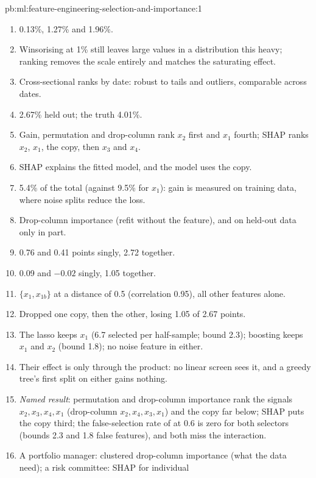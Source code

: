 \begin{solution}{pb:ml:feature-engineering-selection-and-importance:1}
\begin{enumerate}
\item 0.13\%, 1.27\% and 1.96\%.
\item Winsorising at 1\% still leaves large values in a distribution this heavy; ranking removes the scale entirely and
matches the saturating effect.
\item Cross-sectional ranks by date: robust to tails and outliers, comparable across dates.
\item 2.67\% held out; the truth 4.01\%.
\item Gain, permutation and drop-column rank $x_2$ first and $x_1$ fourth; SHAP ranks $x_2$, $x_1$, the copy, then $x_3$ and
$x_4$.
\item SHAP explains the fitted model, and the model uses the copy.
\item 5.4\% of the total (against 9.5\% for $x_1$): gain is measured on training data, where noise splits reduce the loss.
\item Drop-column importance (refit without the feature), and  on held-out data only in part.
\item 0.76 and 0.41 points singly, 2.72 together.
\item 0.09 and $-0.02$ singly, 1.05 together.
\item $\{x_1, x_{1b}\}$ at a distance of 0.5 (correlation 0.95), all other features alone.
\item Dropped one copy, then the other, losing 1.05 of 2.67 points.
\item The lasso keeps $x_1$ (6.7 selected per half-sample; bound 2.3); boosting keeps $x_1$ and $x_2$ (bound 1.8); no noise
feature in either.
\item Their effect is only through the product: no linear screen sees it, and a greedy tree's first split on either
gains nothing.
\item \emph{Named result}: permutation and drop-column importance rank the signals $x_2, x_3, x_4, x_1$ (drop-column $x_2,
x_4, x_3, x_1$) and the copy far below; SHAP puts the copy third; the false-selection rate of  at 0.6 is
zero for both selectors (bounds 2.3 and 1.8 false features), and both miss the interaction.
\item A portfolio manager: clustered drop-column importance (what the data need); a risk committee: SHAP for individual

\end{enumerate}
\end{solution}
